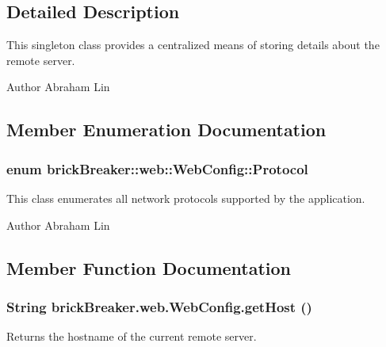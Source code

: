 \subsection{Detailed Description}
This singleton class provides a centralized means of storing details about the remote server.

\begin{DoxyAuthor}{Author}
Abraham Lin 
\end{DoxyAuthor}


\subsection{Member Enumeration Documentation}
\hypertarget{classbrick_breaker_1_1web_1_1_web_config_a67fb01568cd83c5fa0685d95df6ca638}{
\subsubsection[{Protocol}]{\setlength{\rightskip}{0pt plus 5cm}enum {\bf brickBreaker::web::WebConfig::Protocol}}}
\label{classbrick_breaker_1_1web_1_1_web_config_a67fb01568cd83c5fa0685d95df6ca638}
This class enumerates all network protocols supported by the application.

\begin{DoxyAuthor}{Author}
Abraham Lin 
\end{DoxyAuthor}


\subsection{Member Function Documentation}
\hypertarget{classbrick_breaker_1_1web_1_1_web_config_a0face1c0ade730029ff6389b5a610112}{
\subsubsection[{getHost}]{\setlength{\rightskip}{0pt plus 5cm}String brickBreaker.web.WebConfig.getHost ()}}
\label{classbrick_breaker_1_1web_1_1_web_config_a0face1c0ade730029ff6389b5a610112}
Returns the hostname of the current remote server.

